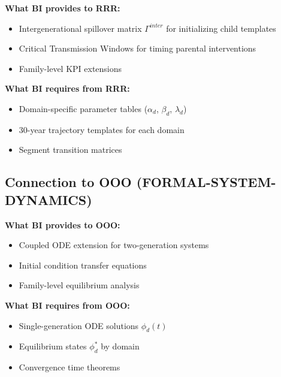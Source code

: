 \begin{tcolorbox}[colback=yellow!5!white, colframe=yellow!75!black,
    title=Integration: BI $\leftrightarrow$ RRR (METHOD-LIFETIME)]
\textbf{What BI provides to RRR:}
\begin{itemize}[nosep]
\item Intergenerational spillover matrix $\Gamma^{inter}$ for initializing child templates
\item Critical Transmission Windows for timing parental interventions
\item Family-level KPI extensions
\end{itemize}

\textbf{What BI requires from RRR:}
\begin{itemize}[nosep]
\item Domain-specific parameter tables ($\alpha_d$, $\beta_d$, $\lambda_d$)
\item 30-year trajectory templates for each domain
\item Segment transition matrices
\end{itemize}
\end{tcolorbox}

\subsection{Connection to OOO (FORMAL-SYSTEM-DYNAMICS)}

\begin{tcolorbox}[colback=yellow!5!white, colframe=yellow!75!black,
    title=Integration: BI $\leftrightarrow$ OOO (FORMAL-SYSTEM-DYNAMICS)]
\textbf{What BI provides to OOO:}
\begin{itemize}[nosep]
\item Coupled ODE extension for two-generation systems
\item Initial condition transfer equations
\item Family-level equilibrium analysis
\end{itemize}

\textbf{What BI requires from OOO:}
\begin{itemize}[nosep]
\item Single-generation ODE solutions $\phi_d(t)$
\item Equilibrium states $\phi^*_d$ by domain
\item Convergence time theorems
\end{itemize}
\end{tcolorbox}

